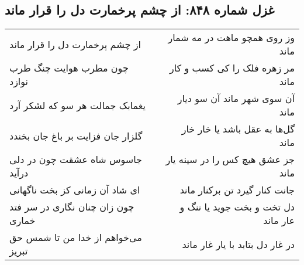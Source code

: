 \begin{center}
\section*{غزل شماره ۸۴۸: از چشم پرخمارت دل را قرار ماند}
\label{sec:0848}
\begin{longtable}{l p{0.5cm} r}
از چشم پرخمارت دل را قرار ماند
&&
وز روی همچو ماهت در مه شمار ماند
\\
چون مطرب هوایت چنگ طرب نوازد
&&
مر زهره فلک را کی کسب و کار ماند
\\
یغمابک جمالت هر سو که لشکر آرد
&&
آن سوی شهر ماند آن سو دیار ماند
\\
گلزار جان فزایت بر باغ جان بخندد
&&
گل‌ها به عقل باشد یا خار خار ماند
\\
جاسوس شاه عشقت چون در دلی درآید
&&
جز عشق هیچ کس را در سینه یار ماند
\\
ای شاد آن زمانی کز بخت ناگهانی
&&
جانت کنار گیرد تن برکنار ماند
\\
چون زان چنان نگاری در سر فتد خماری
&&
دل تخت و بخت جوید یا ننگ و عار ماند
\\
می‌خواهم از خدا من تا شمس حق تبریز
&&
در غار دل بتابد با یار غار ماند
\\
\end{longtable}
\end{center}
